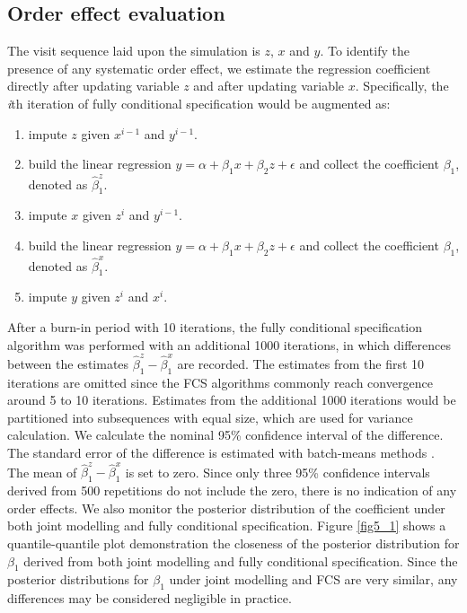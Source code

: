 	\subsection{Order effect evaluation}
	The visit sequence laid upon the simulation is $z$, $x$ and $y$. To identify the presence of any systematic order effect, we estimate the regression coefficient directly after updating variable $z$ and after updating variable $x$. Specifically, the \emph{i}th iteration of fully conditional specification would be augmented as:
	\begin{enumerate}
		\item impute $z$ given $x^{i-1}$ and $y^{i-1}$.
		\item build the linear regression $y = \alpha + \beta_{1}x + \beta_{2}z + \epsilon$ and collect the coefficient $\beta_{1}$, denoted as $\hat{\beta}^z_{1}$.
		\item impute $x$ given $z^{i}$ and $y^{i-1}$.
		\item build the linear regression $y = \alpha + \beta_{1}x + \beta_{2}z + \epsilon$ and collect the coefficient $\beta_{1}$, denoted as $\hat{\beta}^x_{1}$.
		\item impute $y$ given $z^{i}$ and $x^{i}$.	 
	\end{enumerate}
	After a burn-in period with 10 iterations, the fully conditional specification algorithm was performed with an additional 1000 iterations, in which differences between the estimates $\hat{\beta}^z_{1} - \hat{\beta}^x_{1}$ are recorded. The estimates from the first 10 iterations are omitted since the FCS algorithms commonly reach convergence around 5 to 10 iterations. Estimates from the additional 1000 iterations would be partitioned into subsequences with equal size, which are used for variance calculation. We calculate the nominal 95\% confidence interval of the difference. The standard error of the difference is estimated with batch-means methods \citep[p. 124]{albert2009bayesian}. The mean of $\hat{\beta}^z_{1} - \hat{\beta}^x_{1}$ is set to zero. Since only three 95\% confidence intervals derived from 500 repetitions do not include the zero, there is no indication of any order effects. We also monitor the posterior distribution of the coefficient under both joint modelling and fully conditional specification. Figure \ref{fig5_1} shows a quantile-quantile plot demonstration the closeness of the posterior distribution for $\beta_{1}$ derived from both joint modelling and fully conditional specification. Since the posterior distributions for $\beta_{1}$ under joint modelling and FCS are very similar, any differences may be considered negligible in practice.  
